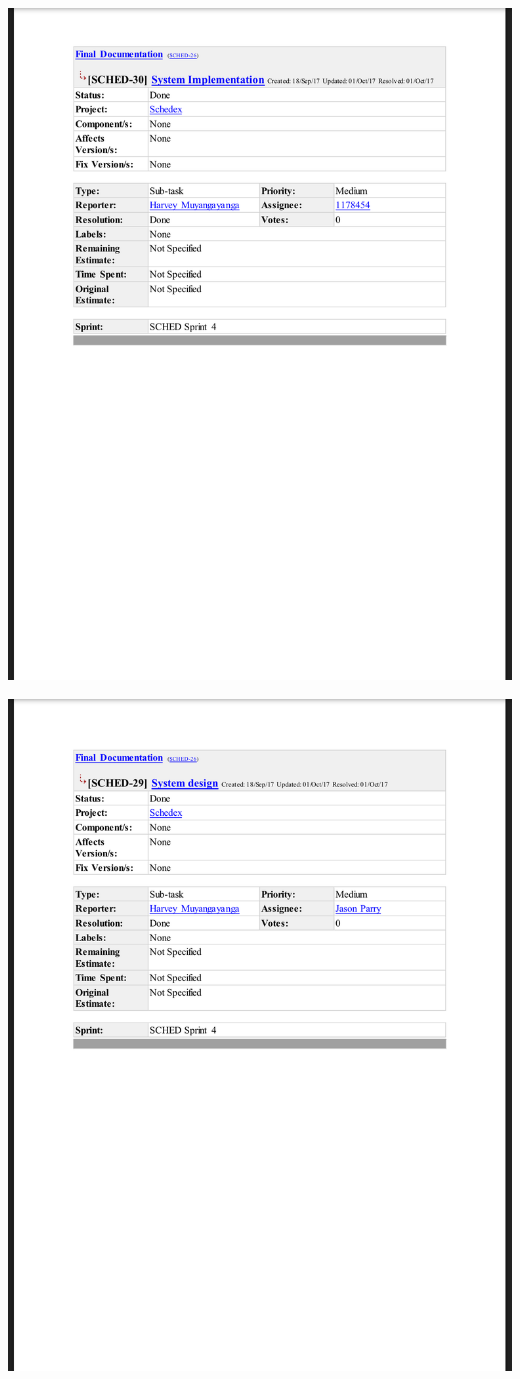 \documentclass{article}
\begin{document}
\centerline{\includegraphics[scale=0.4]{sprint4_2}}

\centerline{\includegraphics[scale=0.4]{sprint4_3}}
\end{document}
